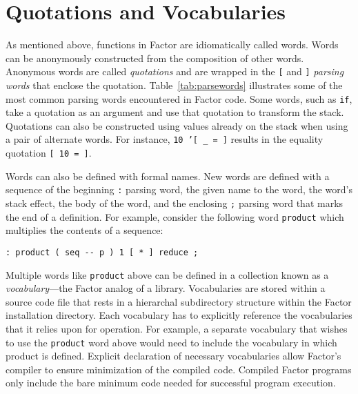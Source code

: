 \documentclass[sigconf]{acmart}
\begin{document}
\section{Quotations and Vocabularies}

As mentioned above, functions in Factor are idiomatically called
words. Words can be anonymously constructed from the composition
of other words. Anonymous words are called \textit{quotations} 
and are wrapped in the \texttt{[} and \texttt{]} \textit{parsing 
words} that enclose the quotation. Table~\ref{tab:parsewords}
illustrates some of the most common parsing words encountered in 
Factor code. Some words, such as \texttt{if}, take a quotation 
as an argument and use that quotation to transform the stack. 
Quotations can also be constructed using values already on the 
stack when using a pair of alternate words. For instance,
\texttt{10 '[ \_ = ]} results in the equality quotation 
\texttt{[ 10 = ]}.

Words can also be defined with formal names. New words are 
defined with a sequence of the beginning  \texttt{:} parsing word,
the given name to the word, the word's stack effect, the body of
the word, and the enclosing \texttt{;} parsing word that marks
the end of a definition. For example, consider the following 
word \texttt{product} which multiplies the contents of a sequence:

\begin{lstlisting}
: product ( seq -- p ) 1 [ * ] reduce ;
\end{lstlisting}

\noindent{}Multiple words like \texttt{product} above can be defined 
in a collection known as a \textit{vocabulary}---the Factor analog 
of a library. Vocabularies are stored within a source code file that
rests in a hierarchal subdirectory structure within the Factor 
installation directory. Each vocabulary has to explicitly reference
the vocabularies that it relies upon for operation. For example, 
a separate vocabulary that wishes to use the \texttt{product} word
above would need to include the vocabulary in which product is 
defined. Explicit declaration of necessary vocabularies allow 
Factor's compiler to ensure minimization of the compiled code. 
Compiled Factor programs only include the bare minimum code needed
for successful program execution. 
\end{document}
